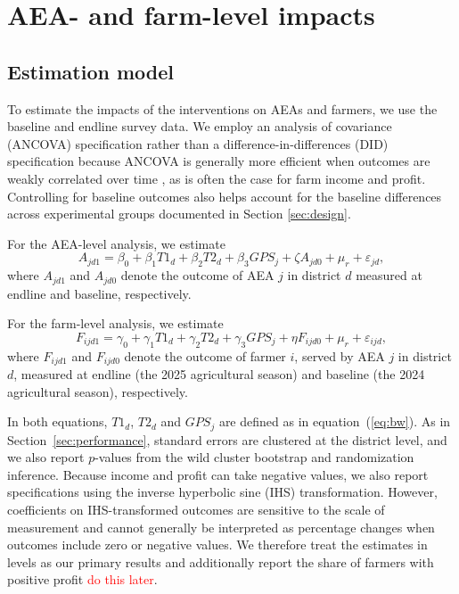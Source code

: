 \documentclass[11pt]{article}
\begin{document}
\section{AEA- and farm-level impacts}\label{sec:impacts}

\subsection{Estimation model}

To estimate the impacts of the interventions on AEAs and farmers, we use the baseline and endline survey data. We employ an analysis of covariance (ANCOVA) specification rather than a difference-in-differences (DID) specification because ANCOVA is generally more efficient when outcomes are weakly correlated over time \citep{mckenzie_beyond_2012}, as is often the case for farm income and profit. Controlling for baseline outcomes also helps account for the baseline differences across experimental groups documented in Section \ref{sec:design}. 

For the AEA-level analysis, we estimate
\begin{equation}
A_{jd1} = \beta_0 + \beta_1 T1_d + \beta_2 T2_d + \beta_3 GPS_j + \zeta A_{jd0} + \mu_r + \varepsilon_{jd},
\label{eq:ancova_aea}
\end{equation}
where $A_{jd1}$ and $A_{jd0}$ denote the outcome of AEA $j$ in district $d$ measured at endline and baseline, respectively.

For the farm-level analysis, we estimate
\begin{equation}
F_{ijd1} = \gamma_0 + \gamma_1 T1_d + \gamma_2 T2_d + \gamma_3 GPS_j + \eta F_{ijd0} + \mu_r + \varepsilon_{ijd},
\label{eq:ancova_farm}
\end{equation}
where $F_{ijd1}$ and $F_{ijd0}$ denote the outcome of farmer $i$, served by AEA $j$ in district $d$, measured at endline (the 2025 agricultural season) and baseline (the 2024 agricultural season), respectively. 

In both equations, $T1_d$, $T2_d$ and $GPS_j$ are defined as in equation~(\ref{eq:bw}). As in Section~\ref{sec:performance}, standard errors are clustered at the district level, and we also report $p$-values from the wild cluster bootstrap and randomization inference. Because income and profit can take negative values, we also report specifications using the inverse hyperbolic sine (IHS) transformation. However, coefficients on IHS-transformed outcomes are sensitive to the scale of measurement and cannot generally be interpreted as percentage changes when outcomes include zero or negative values. We therefore treat the estimates in levels as our primary results and additionally report the share of farmers with positive profit \textcolor{red}{do this later}.
\end{document}
